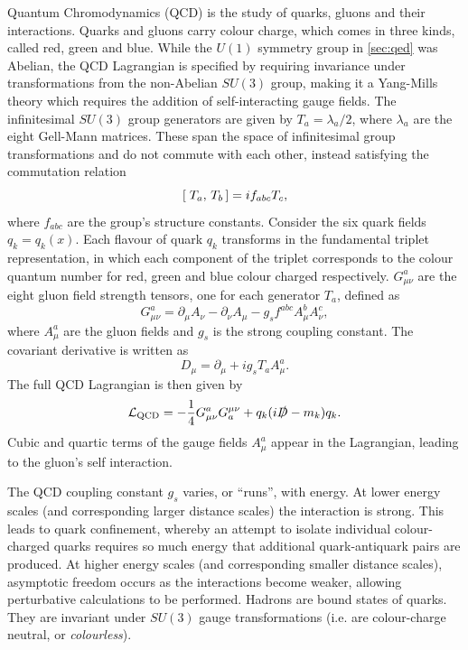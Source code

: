 Quantum Chromodynamics (QCD) is the study of quarks, gluons and their interactions.
Quarks and gluons carry colour charge, which comes in three kinds, called red, green and blue.
While the $U(1)$ symmetry group in \cref{sec:qed} was Abelian, the QCD Lagrangian is specified by requiring invariance under transformations from the non-Abelian $SU(3)$ group, making it a Yang\nobreakdash-Mills theory \cite{PhysRev.96.191} which requires the addition of self-interacting gauge fields.
The infinitesimal $SU(3)$ group generators are given by $T_a = \lambda_a / 2$, where $\lambda_a$ are the eight Gell\nobreakdash-Mann matrices.
These span the space of infinitesimal group transformations and do not commute with each other, instead satisfying the commutation relation
%
\begin{equation}
  [\; T_a,\,T_b\,] = i f_{abc} T_c ,
\end{equation}
%
where $f_{abc}$ are the group's structure constants.
Consider the six quark fields $q_k = q_k(x)$.
Each flavour of quark $q_k$ transforms in the fundamental triplet representation, in which each component of the triplet corresponds to the colour quantum number for red, green and blue colour charged respectively.
$G^{a}_{\mu\nu}$ are the eight gluon field strength tensors, one for each generator $T_a$, defined as
%
\begin{equation}\label{eq:qcd_field_strength_tensor}
  G^a_{\mu\nu} = \partial_\mu A_\nu - \partial_\nu A_\mu - g_s f^{abc} A_\mu^b A_\nu^c ,
\end{equation}
%
where $A_\mu^a$ are the gluon fields and $g_s$ is the strong coupling constant. The covariant derivative is written as
%
\begin{equation}\label{eq:qcd_covariant_derivative}
  D_\mu = \partial_\mu + i g_s T_a A_\mu^a .
\end{equation}
%
The full QCD Lagrangian is then given by
%
\begin{equation}\label{eq:qcd_lagrangian}
  \mathcal{L}_\textnormal{QCD} = 
  - \frac{1}{4} G^{a}_{\mu\nu} G_{a}^{\mu\nu}
  + q_k (i \slashed{D} - m_k) q_k .
\end{equation}
%
Cubic and quartic terms of the gauge fields $A^a_\mu$ appear in the Lagrangian, leading to the gluon's self interaction.

The QCD coupling constant $g_s$ varies, or ``runs'', with energy.
At lower energy scales (and corresponding larger distance scales) the interaction is strong.
This leads to quark confinement, whereby an attempt to isolate individual colour-charged quarks requires so much energy that additional quark-antiquark pairs are produced.
At higher energy scales (and corresponding smaller distance scales), asymptotic freedom occurs as the interactions become weaker, allowing perturbative calculations to be performed.
Hadrons are bound states of quarks.
They are invariant under $SU(3)$ gauge transformations (i.e. are colour-charge neutral, or \textit{colourless}).



